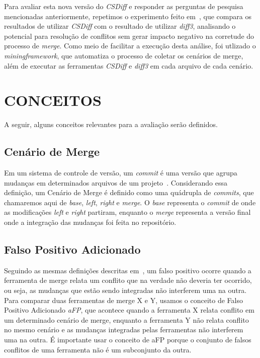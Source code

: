 Para avaliar esta nova versão do \emph{CSDiff} e responder as perguntas de pesquisa mencionadas anteriormente, repetimos
o experimento feito em~\cite{heitor21,clem21}, que compara os resultados de utilizar \emph{CSDiff} com o resultado
de utilizar \emph{diff3}, analisando o potencial para resolução de conflitos sem gerar impacto negativo na corretude do
processo de \emph{merge}. Como meio de facilitar a execução desta análise, foi utlizado o \emph{miningframework}, que
automatiza o processo de coletar os cenários de merge, além de executar as ferramentas \emph{CSDiff} e \emph{diff3} em
cada arquivo de cada cenário.

\section{CONCEITOS}
A seguir, alguns conceitos relevantes para a avaliação serão definidos.
\subsection{Cenário de Merge}
Em um sistema de controle de versão, um \emph{commit} é uma versão que agrupa mudanças em
determinados arquivos de um projeto~\cite{koc11}.
Considerando essa definição, um Cenário de Merge é definido como uma quádrupla de \emph{commits},
que chamaremos aqui de \emph{base},
\emph{left}, \emph{right} e \emph{merge}. O \emph{base} representa o \emph{commit} de onde as modificações \emph{left} e \emph{right}
partiram, enquanto o \emph{merge} representa a versão final onde a integração das mudanças foi feita no repositório.
\subsection{Falso Positivo Adicionado}
Seguindo as mesmas definições descritas em~\cite{clem21},
um falso positivo ocorre quando a ferramenta de merge relata um conflito
que na verdade não deveria ter ocorrido, ou seja, as
mudanças que estão sendo integradas
não interferem uma na outra. Para comparar duas ferramentas de merge
X e Y, usamos o conceito de Falso Positivo Adicionado \emph{aFP}, que acontece quando
a ferramenta X relata conflito em um determinado cenário de merge,
enquanto a ferramenta Y não relata conflito no mesmo cenário e
as mudanças integradas pelas ferramentas não interferem uma na outra.
É importante usar o conceito de aFP porque o conjunto de falsos conflitos
de uma ferramenta não é um subconjunto da outra.
